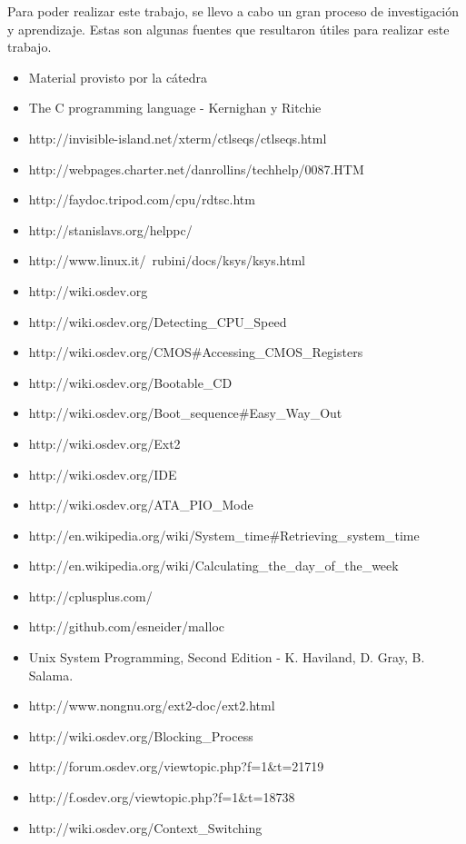 \documentclass[a4paper,10pt]{article}
\begin{document}
Para poder realizar este trabajo, se llevo a cabo un gran proceso de investigación y aprendizaje. Estas son algunas fuentes que resultaron útiles para realizar 
este trabajo.\\

\begin{itemize}
  \item Material provisto por la cátedra
  \item The C programming language - Kernighan y Ritchie
  \item http://invisible-island.net/xterm/ctlseqs/ctlseqs.html
  \item http://webpages.charter.net/danrollins/techhelp/0087.HTM
  \item http://faydoc.tripod.com/cpu/rdtsc.htm
  \item http://stanislavs.org/helppc/
  \item http://www.linux.it/~rubini/docs/ksys/ksys.html
  \item http://wiki.osdev.org
  \item http://wiki.osdev.org/Detecting\_CPU\_Speed
  \item	http://wiki.osdev.org/CMOS\#Accessing\_CMOS\_Registers
  \item http://wiki.osdev.org/Bootable\_CD
  \item http://wiki.osdev.org/Boot\_sequence\#Easy\_Way\_Out
  \item http://wiki.osdev.org/Ext2
  \item http://wiki.osdev.org/IDE
  \item http://wiki.osdev.org/ATA\_PIO\_Mode
  \item http://en.wikipedia.org/wiki/System\_time\#Retrieving\_system\_time
  \item http://en.wikipedia.org/wiki/Calculating\_the\_day\_of\_the\_week
  \item http://cplusplus.com/
  \item http://github.com/esneider/malloc
  \item Unix System Programming, Second Edition - K. Haviland, D. Gray, B. Salama.
  \item http://www.nongnu.org/ext2-doc/ext2.html
  \item http://wiki.osdev.org/Blocking\_Process
  \item http://forum.osdev.org/viewtopic.php?f=1\&t=21719
  \item http://f.osdev.org/viewtopic.php?f=1\&t=18738
  \item http://wiki.osdev.org/Context\_Switching

\end{itemize}
\end{document}
